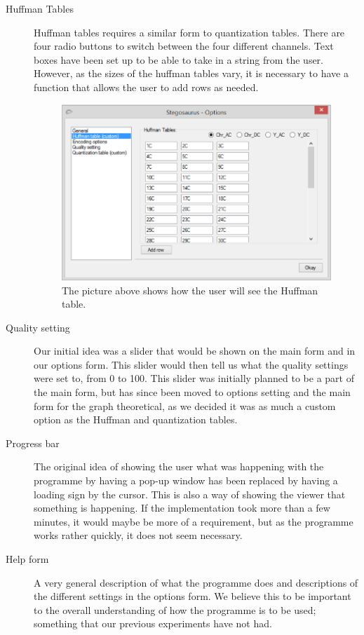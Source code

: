 \begin{description}
\item[Huffman Tables]
Huffman tables requires a similar form to quantization tables. There are four radio buttons to switch between the four different channels. Text boxes have been set up to be able to take in a string from the user. However, as the sizes of the huffman tables vary, it is necessary to have a function that allows the user to add rows as needed.
\begin{figure}
	\centering
	\includegraphics[width=1\textwidth]{figures/StegoOptionHuff.png}
	\caption{The picture above shows how the user will see the Huffman table.}
	\label{fig:StegoOptionHuff}
\end{figure}

\item[Quality setting]
Our initial idea was a slider that would be shown on the main form and in our options form. This slider would then tell us what the quality settings were set to, from 0 to 100. This slider was initially planned to be a part of the main form, but has since been moved to options setting and the main form for the graph theoretical, as we decided it was as much a custom option as the Huffman and quantization tables.

\item[Progress bar]
The original idea of showing the user what was happening with the programme by having a pop-up window has been replaced by having a loading sign by the cursor. This is also a way of showing the viewer that something is happening. If the implementation took more than a few minutes, it would maybe be more of a requirement, but as the programme works rather quickly, it does not seem necessary.

\item[Help form]
A very general description of what the programme does and descriptions of the different settings in the options form. We believe this to be important to the overall understanding of how the programme is to be used; something that our previous experiments have not had.
\end{description}

